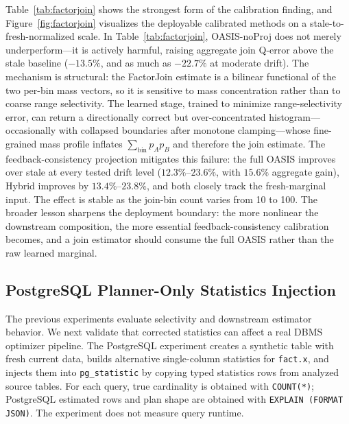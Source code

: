 \documentclass[preprint,12pt]{elsarticle}
\newcommand{\oasisUseMaxWidthResize}[1]{%
  \renewcommand{\resizebox}[3]{\adjustbox{max width=#1}{##3}}%
}
\begin{document}
Table~\ref{tab:factorjoin} shows the strongest form of the calibration finding,
and Figure~\ref{fig:factorjoin} visualizes the deployable calibrated methods on
a stale-to-fresh-normalized scale.
In Table~\ref{tab:factorjoin}, OASIS-noProj does not merely underperform---it is actively harmful, raising
aggregate join Q-error above the stale baseline ($-13.5\%$, and as much as
$-22.7\%$ at moderate drift). The mechanism is structural: the FactorJoin
estimate is a bilinear functional of the two per-bin mass vectors, so it is
sensitive to mass concentration rather than to coarse range selectivity. The
learned stage, trained to minimize range-selectivity error, can return a
directionally correct but over-concentrated histogram---occasionally with
collapsed boundaries after monotone clamping---whose fine-grained mass profile
inflates $\sum_{\text{bin}} p_A p_B$ and therefore the join estimate. The
feedback-consistency projection mitigates this failure: the full OASIS improves
over stale at every tested drift level ($12.3\%$--$23.6\%$, with $15.6\%$
aggregate gain), Hybrid improves by $13.4\%$--$23.8\%$, and both closely track
the fresh-marginal input. The effect is stable as the join-bin count varies from
10 to 100. The broader lesson
sharpens the deployment boundary: the more nonlinear the downstream composition,
the more essential feedback-consistency calibration becomes, and a join estimator
should consume the full OASIS rather than the raw learned marginal.

\subsection{PostgreSQL Planner-Only Statistics Injection}
\label{sec:postgres-planner}

The previous experiments evaluate selectivity and downstream estimator
behavior. We next validate that corrected statistics can affect a real DBMS
optimizer pipeline. The PostgreSQL experiment creates a synthetic table with
fresh current data, builds alternative single-column statistics for
\texttt{fact.x}, and injects them into \texttt{pg\_statistic} by copying typed
statistics rows from analyzed source tables. For each query, true cardinality
is obtained with \texttt{COUNT(*)}; PostgreSQL estimated rows and plan shape are
obtained with \texttt{EXPLAIN (FORMAT JSON)}. The experiment does not measure
query runtime.

\begingroup
\oasisUseMaxWidthResize{.88\columnwidth}

\endgroup
\end{document}
